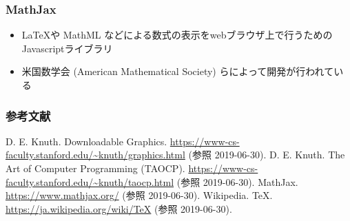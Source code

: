 \documentclass[dvipdfmx]{beamer}
\begin{document}
\begin{frame}
    \frametitle{MathJax \cite{mathjax}}
    \large
    \begin{itemize}
        \item \LaTeX や MathML などによる数式の表示をwebブラウザ上で行うためのJavascriptライブラリ
        \item 米国数学会 (American Mathematical Society) らによって開発が行われている
    \end{itemize}
\end{frame}

\begin{frame}
    \frametitle{参考文献}
    \begin{thebibliography}{99}
         D. E. Knuth. Downloadable Graphics. \url{https://www-cs-faculty.stanford.edu/~knuth/graphics.html} (参照 2019-06-30).
         D. E. Knuth. The Art of Computer Programming (TAOCP). \url{https://www-cs-faculty.stanford.edu/~knuth/taocp.html} (参照 2019-06-30).
         MathJax. \url{https://www.mathjax.org/} (参照 2019-06-30).
         Wikipedia. TeX. \url{https://ja.wikipedia.org/wiki/TeX}
         (参照 2019-06-30).
    \end{thebibliography}    
\end{frame}
\end{document}
